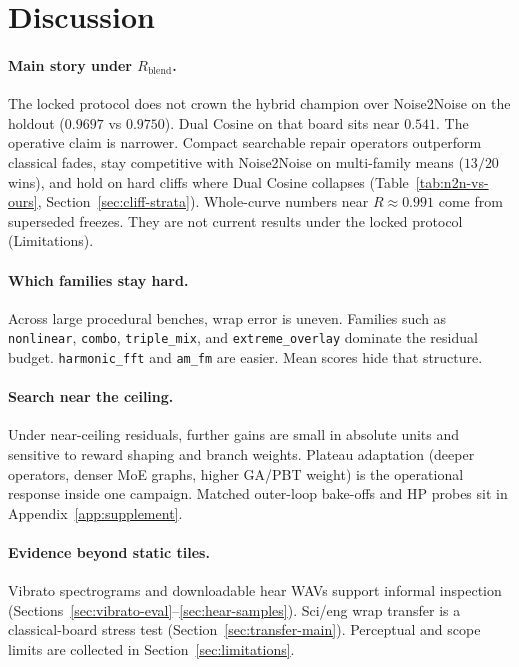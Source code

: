 \section{Discussion}
\label{sec:discussion}

\paragraph{Main story under $R_{\mathrm{blend}}$.}
The locked protocol does not crown the hybrid champion over Noise2Noise on the holdout
($0.9697$ vs $0.9750$).
Dual Cosine on that board sits near $0.541$.
The operative claim is narrower.
Compact searchable repair operators outperform classical fades, stay competitive with Noise2Noise on multi-family means ($13/20$ wins), and hold on hard cliffs where Dual Cosine collapses
(Table~\ref{tab:n2n-vs-ours}, Section~\ref{sec:cliff-strata}).
Whole-curve numbers near $R{\approx}0.991$ come from superseded freezes.
They are not current results under the locked protocol (Limitations).

\paragraph{Which families stay hard.}
Across large procedural benches, wrap error is uneven.
Families such as \texttt{nonlinear}, \texttt{combo}, \texttt{triple\_mix}, and \texttt{extreme\_overlay} dominate the residual budget.
\texttt{harmonic\_fft} and \texttt{am\_fm} are easier.
Mean scores hide that structure.

\paragraph{Search near the ceiling.}
Under near-ceiling residuals, further gains are small in absolute units and sensitive to reward shaping and branch weights.
Plateau adaptation (deeper operators, denser MoE graphs, higher GA/PBT weight) is the operational response inside one campaign.
Matched outer-loop bake-offs and HP probes sit in Appendix~\ref{app:supplement}.

\paragraph{Evidence beyond static tiles.}
Vibrato spectrograms and downloadable hear WAVs support informal inspection (Sections~\ref{sec:vibrato-eval}--\ref{sec:hear-samples}).
Sci/eng wrap transfer is a classical-board stress test (Section~\ref{sec:transfer-main}).
Perceptual and scope limits are collected in Section~\ref{sec:limitations}.
